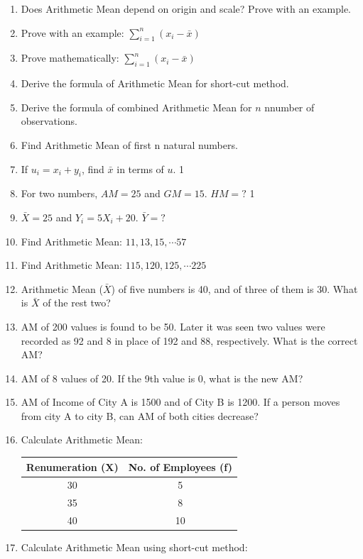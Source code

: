 \documentclass[a4paper,oneside]{book}
\begin{document}
\begin{enumerate}
    \item Does Arithmetic Mean depend on origin and scale? Prove with an example.
    \item Prove with an example: $\displaystyle \sum_{i=1}^n (x_i-\bar x)$
    \item Prove mathematically: $\displaystyle \sum_{i=1}^n (x_i-\bar x)$
    \item Derive the formula of Arithmetic Mean for short-cut method.
    \item Derive the formula of combined Arithmetic Mean for $n$ nnumber of observations.
    \item Find Arithmetic Mean of first n natural numbers.
    \item If $u_i = x_i + y_i$, find $\bar x$ in terms of $u$. \hfill 1
    \item For two numbers, $AM=25$ and $GM=15$. $HM=?$ \hfill 1
    \item $\bar X = 25$ and $Y_i = 5X_i + 20$. $\bar Y = ?$
    \item Find Arithmetic Mean: $11,13,15, \cdots 57$
    \item Find Arithmetic Mean: $115,120,125, \cdots 225$
    \item Arithmetic Mean ($\bar X$) of five numbers is 40, and of three of them is 30. What is $\bar X$ of the rest two?
    \item AM of 200 values is found to be 50. Later it was seen two values were recorded as 92 and 8 in place of 192 and 88, respectively. What is the correct AM?
    \item AM of 8 values of 20. If the 9th value is 0, what is the new AM?
    \item AM of Income of City A is 1500 and of City B is 1200. If a person moves from city A to city B, can AM of both cities decrease?
    \item Calculate Arithmetic Mean:
    
    \begin{table}[h]
    \centering
\begin{tabular}{c|c}
\textbf{Renumeration (X)} & \textbf{No. of Employees (f)} \\ \hline
30               & 5                    \\ \hline
35               & 8                    \\ \hline
40               & 10                  
\end{tabular}
\end{table}
    
    \item Calculate Arithmetic Mean using short-cut method:
    

\end{enumerate}
\end{document}
